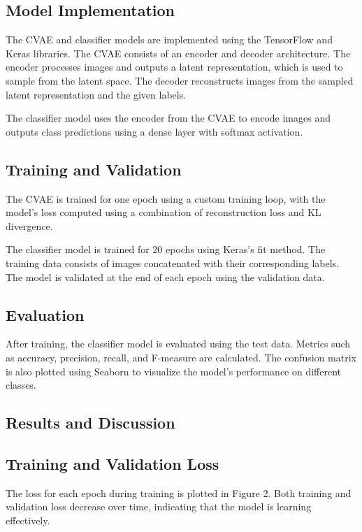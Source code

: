 \documentclass{article}
\begin{document}
\subsection{Model Implementation}
The CVAE and classifier models are implemented using the TensorFlow and Keras libraries. The CVAE consists of an encoder and decoder architecture. The encoder processes images and outputs a latent representation, which is used to sample from the latent space. The decoder reconstructs images from the sampled latent representation and the given labels.

The classifier model uses the encoder from the CVAE to encode images and outputs class predictions using a dense layer with softmax activation. 

\subsection{Training and Validation}
The CVAE is trained for one epoch using a custom training loop, with the model's loss computed using a combination of reconstruction loss and KL divergence.

The classifier model is trained for 20 epochs using Keras's fit method. The training data consists of images concatenated with their corresponding labels. The model is validated at the end of each epoch using the validation data.

\subsection{Evaluation}
After training, the classifier model is evaluated using the test data. Metrics such as accuracy, precision, recall, and F-measure are calculated. The confusion matrix is also plotted using Seaborn to visualize the model's performance on different classes.

\subsection{Results and Discussion}






\subsection{Training and Validation Loss}
The loss for each epoch during training is plotted in Figure 2. Both training and validation loss decrease over time, indicating that the model is learning effectively.
\end{document}
